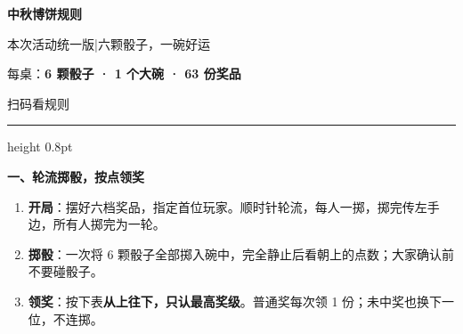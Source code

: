 \documentclass[11pt,a4paper,fontset=none]{ctexart}
\newcommand{\shead}[2]{\par\vspace{7pt}%
  {\fontsize{12.5}{17}\selectfont\bfseries\sffamily
  #1、#2\hspace{10pt}{\color{rulegray}\leaders\hrule height 0.3pt\hfill}\kern0pt\par}\vspace{4pt}}
\begin{document}
\fontsize{11}{16}\selectfont
\begin{minipage}[c]{0.79\linewidth}
  {\fontsize{28}{34}\selectfont\bfseries 中秋博饼规则\par}
  \vspace{7pt}
  {\fontsize{10.5}{14.5}\selectfont 本次活动统一版\quad |\quad 六颗骰子，一碗好运\par}
  \vspace{7pt}
  {\fontsize{10.5}{14.5}\selectfont 每桌：\textbf{6 颗骰子 · 1 个大碗 · 63 份奖品}\par}
\end{minipage}\hfill
\begin{minipage}[c]{0.18\linewidth}
  \centering
  \par
  {\fontsize{9}{11}\selectfont\sffamily 扫码看规则\par}
\end{minipage}\par
\vspace{5pt}\hrule height 0.8pt

\shead{一}{轮流掷骰，按点领奖}
\begin{enumerate}
  \item \textbf{开局}：摆好六档奖品，指定首位玩家。顺时针轮流，每人一掷，掷完传左手边，所有人掷完为一轮。
  \item \textbf{掷骰}：一次将 6 颗骰子全部掷入碗中，完全静止后看朝上的点数；大家确认前不要碰骰子。
  \item \textbf{领奖}：按下表\textbf{从上往下，只认最高奖级}。普通奖每次领 1 份；未中奖也换下一位，不连掷。
\end{enumerate}
\end{document}
